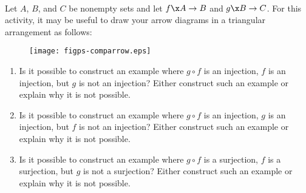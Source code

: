 \begin{activity} \label{A:exploringcomposites} \hfill \\
Let  $A$, $B$, and  $C$  be nonempty sets and let  $f\x A \to B$  and  $g\x B \to C$.  For this activity, it may be useful to draw your arrow diagrams in a triangular arrangement as follows:

\begin{figure}[h]
\begin{center}
\texttt{[image: figps-comparrow.eps]}
\end{center}
\end{figure}

\begin{enumerate}
\item Is it possible to construct an example where  $g \circ f$  is an injection,  $f$  is an injection, but  $g$  is not an injection?  Either construct such an example or explain why it is not possible.

\item Is it possible to construct an example where  $g \circ f$  is an injection,  $g$  is an injection, but  $f$  is not an injection?  Either construct such an example or explain why it is not possible.

\item Is it possible to construct an example where  $g \circ f$  is a surjection,  $f$  is a surjection, but  $g$  is not a surjection?  Either construct such an example or explain why it is not possible.


\end{enumerate}
\end{activity}
